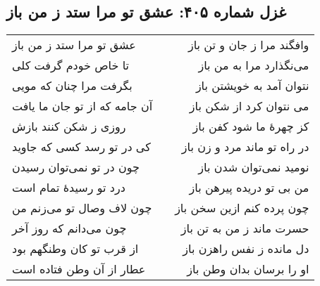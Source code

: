 \begin{center}
\section*{غزل شماره ۴۰۵: عشق تو مرا ستد ز من باز}
\label{sec:405}
\begin{longtable}{l p{0.5cm} r}
عشق تو مرا ستد ز من باز
&&
وافگند مرا ز جان و تن باز
\\
تا خاص خودم گرفت کلی
&&
می‌نگذارد مرا به من باز
\\
بگرفت مرا چنان که مویی
&&
نتوان آمد به خویشتن باز
\\
آن جامه که از تو جان ما یافت
&&
می نتوان کرد از شکن باز
\\
روزی ز شکن کنند بازش
&&
کز چهرهٔ ما شود کفن باز
\\
کی در تو رسد کسی که جاوید
&&
در راه تو ماند مرد و زن باز
\\
چون در تو نمی‌توان رسیدن
&&
نومید نمی‌توان شدن باز
\\
درد تو رسیدهٔ تمام است
&&
من بی تو دریده پیرهن باز
\\
چون لاف وصال تو می‌زنم من
&&
چون پرده کنم ازین سخن باز
\\
چون می‌دانم که روز آخر
&&
حسرت ماند ز من به تن باز
\\
از قرب تو کان وطنگهم بود
&&
دل مانده ز نفس راهزن باز
\\
عطار از آن وطن فتاده است
&&
او را برسان بدان وطن باز
\\
\end{longtable}
\end{center}

